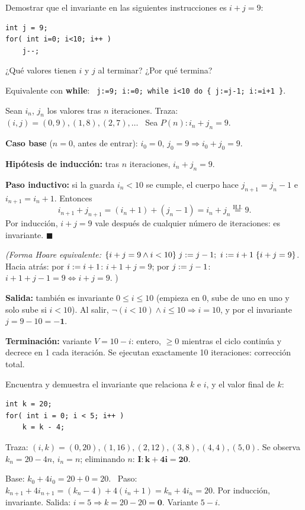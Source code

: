 \begin{prob}[\examen]
Demostrar que el invariante en las siguientes instrucciones es $i+j=9$:
\begin{lstlisting}
int j = 9;
for( int i=0; i<10; i++ )
    j--;
\end{lstlisting}
¿Qué valores tienen $i$ y $j$ al terminar? ¿Por qué termina?
\end{prob}
\begin{sol}
Equivalente con \textbf{while}: \ \texttt{j:=9; i:=0; while i<10 do \{ j:=j-1; i:=i+1 \}}.

Sean $i_n$, $j_n$ los valores tras $n$ iteraciones. Traza: $(i,j)=(0,9),(1,8),(2,7),\dots$ \ Sea $P(n): i_n+j_n=9$.

\textbf{Caso base} ($n=0$, antes de entrar): $i_0=0$, $j_0=9\Rightarrow i_0+j_0=9$. \checkmark

\textbf{Hipótesis de inducción:} tras $n$ iteraciones, $i_n+j_n=9$.

\textbf{Paso inductivo:} si la guarda $i_n<10$ se cumple, el cuerpo hace $j_{n+1}=j_n-1$ e $i_{n+1}=i_n+1$. Entonces
\[i_{n+1}+j_{n+1}=(i_n+1)+(j_n-1)=i_n+j_n\overset{\text{H.I.}}{=}9.\]
Por inducción, $i+j=9$ vale después de cualquier número de iteraciones: es invariante. $\blacksquare$

\emph{(Forma Hoare equivalente:} $\{i+j=9\land i<10\}\;j\mathrel{:=} j-1;\ i\mathrel{:=} i+1\;\{i+j=9\}$. Hacia atrás: por $i\mathrel{:=} i+1$: $i+1+j=9$; por $j\mathrel{:=} j-1$: $i+1+j-1=9\iff i+j=9$. \checkmark)

\textbf{Salida:} también es invariante $0\le i\le10$ (empieza en 0, sube de uno en uno y solo sube si $i<10$). Al salir, $\neg(i<10)\land i\le10\Rightarrow i=10$, y por el invariante $j=9-10=\mathbf{-1}$.

\textbf{Terminación:} variante $V=10-i$: entero, $\ge0$ mientras el ciclo continúa y decrece en 1 cada iteración. Se ejecutan exactamente 10 iteraciones: corrección total.
\end{sol}

\begin{prob}[\simil]
Encuentra y demuestra el invariante que relaciona $k$ e $i$, y el valor final de $k$:
\begin{lstlisting}
int k = 20;
for( int i = 0; i < 5; i++ )
    k = k - 4;
\end{lstlisting}
\end{prob}
\begin{sol}
Traza: $(i,k)=(0,20),(1,16),(2,12),(3,8),(4,4),(5,0)$. Se observa $k_n=20-4n$, $i_n=n$; eliminando $n$: $\mathbf{I: k+4i=20}$.

Base: $k_0+4i_0=20+0=20$. \ Paso: $k_{n+1}+4i_{n+1}=(k_n-4)+4(i_n+1)=k_n+4i_n=20$. Por inducción, invariante.
Salida: $i=5\Rightarrow k=20-20=\mathbf 0$. Variante $5-i$.
\end{sol}

